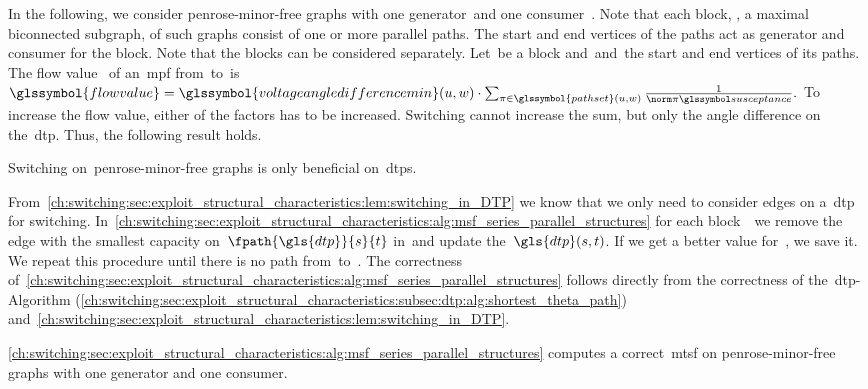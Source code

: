 In the following, we consider penrose-minor-free graphs with one
generator~\source and one consumer~\sink. Note that each block, \ie, a maximal
biconnected subgraph, of such graphs consist of one or more parallel paths. The
start and end vertices of the paths act as generator and consumer for the block.
Note that the blocks can be considered separately. Let~\block be a block
and~\vertexa and~\vertexc the start and end vertices of its paths. The flow
value~ of an~\gls{mpf} from~\vertexa to~\vertexc is
%
% 
$
% 
%
%
\glssymbol{flowvalue} = 
\glssymbol{voltageangledifferencemin}(\vertexa, \vertexc)
%
\cdot
%
\sum_{\pathu\in\glssymbol{pathset}(\vertexa,\vertexc)} 
\frac{1}{\bnorm{\pathu}}.%
%
$
%
To increase the flow value, either of the factors has to be increased. Switching
cannot increase the sum, but only the angle difference on the~\gls{dtp}. Thus,
the following result holds.
% 
\begin{lemma}
    Switching on~penrose-minor-free graphs is only beneficial
    on~\gls{dtp}{s}.
    \label{ch:switching:sec:exploit_structural_characteristics:lem:switching_in_DTP}
\end{lemma}
% 
From~\cref{ch:switching:sec:exploit_structural_characteristics:lem:switching_in_DTP}
we know that we only need to consider edges on a~\gls{dtp} for switching.
In~\cref{ch:switching:sec:exploit_structural_characteristics:alg:msf_series_parallel_structures}
for each block~\block\ we remove the edge with the smallest capacity
on~$\fpath{\gls{dtp}}{\source}{\sink}$ in~\block and update
the~$\gls{dtp}(\source,\sink)$. If we get a better value
for~, we save it. We repeat this procedure until there is
no path from~\source to~\sink.
% 
The correctness of~\cref{ch:switching:sec:exploit_structural_characteristics:alg:msf_series_parallel_structures} follows directly 
from the correctness of the~\gls{dtp}-Algorithm 
(\cref{ch:switching:sec:exploit_structural_characteristics:subsec:dtp:alg:shortest_theta_path}) and~\cref{ch:switching:sec:exploit_structural_characteristics:lem:switching_in_DTP}.
% 
\begin{theorem}
  
\cref{ch:switching:sec:exploit_structural_characteristics:alg:msf_series_parallel_structures}
  computes a correct~\gls{mtsf} on penrose-minor-free graphs with one generator
  and one consumer.
  \label{ch:switching:sec:exploit_structural_characteristics:lem:algo2_correct_msf_on_st_diamond_graphs}
\end{theorem}
